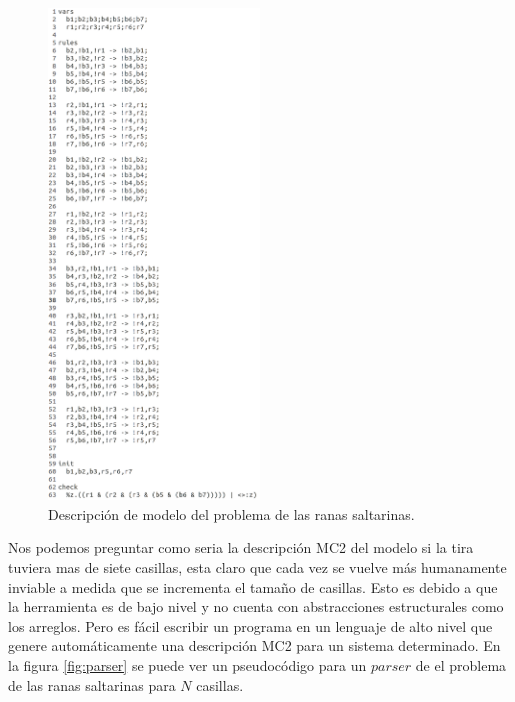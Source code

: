 \begin{figure}[H]
  \centering
  \includegraphics[width=0.5\textwidth]{Figures/ranas.png}
  \caption{Descripción de modelo del problema de las ranas saltarinas.}
  \label{fig:ranas}
\end{figure}

Nos podemos preguntar como seria la descripción MC2 del modelo si la tira tuviera mas de siete casillas, esta claro que cada vez se vuelve más humanamente inviable a medida que se incrementa el tamaño de casillas. Esto es debido a que la herramienta es de bajo nivel y no cuenta con abstracciones estructurales como los arreglos. Pero es fácil escribir un programa en un lenguaje de alto nivel que genere automáticamente una descripción MC2 para un sistema determinado. En la figura \ref{fig:parser} se puede ver un pseudocódigo para un $parser$ de el problema de las ranas saltarinas para $N$ casillas.

